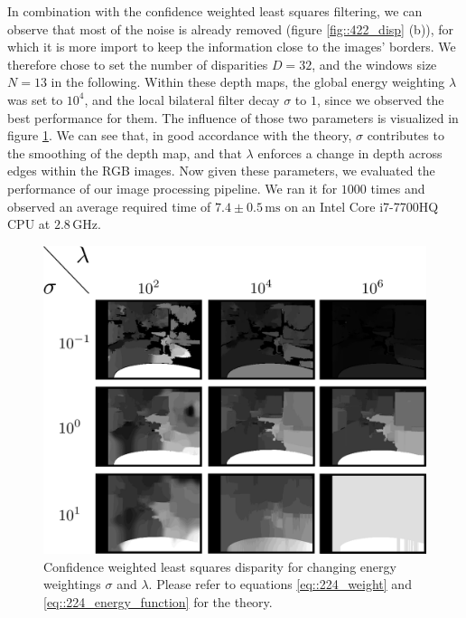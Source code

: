 In combination with the confidence weighted least squares filtering, we can observe that most of the noise is already removed (figure \ref{fig::422_disp} (b)), for which it is more import to keep the information close to the images' borders. We therefore chose to set the number of disparities $D=32$, and the windows size $N=13$ in the following. Within these depth maps, the global energy weighting $\lambda$ was set to $10^4$, and the local bilateral filter decay $\sigma$ to $1$, since we observed the best performance for them. The influence of those two parameters is visualized in figure \ref{fig::422_sigma_lambda}. We can see that, in good accordance with the theory, $\sigma$ contributes to the smoothing of the depth map, and that $\lambda$ enforces a change in depth across edges within the RGB images. Now given these parameters, we evaluated the performance of our image processing pipeline. We ran it for $1000$ times and observed an average required time of $7.4\pm0.5\,\text{ms}$ on an Intel Core i7-7700HQ CPU at $2.8\,\text{GHz}$.
\begin{figure}[h!]
	\centering
	\includegraphics[scale=.2]{chapters/04_experiments/02_autonomous_walking/02_depth_map_parameter_tuning/sigma_lambda.png}
	\caption{Confidence weighted least squares disparity for changing energy weightings $\sigma$ and $\lambda$. Please refer to equations \ref{eq::224_weight} and \ref{eq::224_energy_function} for the theory.}
	\label{fig::422_sigma_lambda}
\end{figure}
\FloatBarrier
